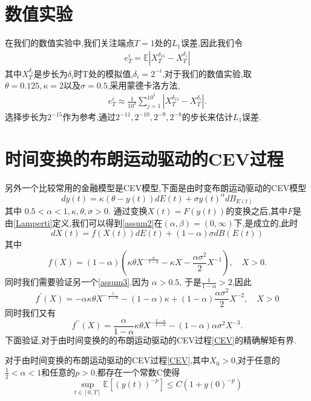 \section{数值实验}
在我们的数值实验中,我们关注端点$T = 1$处的$L_1$误差,因此我们令
\begin{align*}
	e_T^{i}=\mathbb{E}\left|X_T^{\delta _{15}}-X_T^{\delta _i}\right|
\end{align*}
其中$X_T^{\delta _i}$是步长为$\delta _i$时T处的模拟值,$\delta _i = 2^{-i}$,对于我们的数值实验,取$\theta=0.125,\kappa=2$以及$\sigma=0.5$,采用蒙德卡洛方法,
\begin{align*}
	e_{T}^i\approx\frac{1}{10^3}\sum_{j=1}^{10^3}\left|X_T^{\delta _{15}}-X_T^{\delta _i}\right|.
\end{align*}
选择步长为$2^{-15}$作为参考,通过${2^{-11},2^{-10},2^{-9},2^{-8}}$的步长来估计$L_1$误差.
\section{时间变换的布朗运动驱动的CEV过程}
另外一个比较常用的金融模型是CEV模型,下面是由时变布朗运动驱动的CEV模型
\begin{equation}\label{CEV}
	dy(t)=\kappa(\theta-y(t))dE(t)+\sigma y(t)^\alpha dB_{E(t)}
\end{equation}
其中 $0.5<\alpha<1,\kappa,\theta,\sigma>0.$ 通过变换$X(t)=F(y(t))$的变换之后,其中$F$是由\cref{Lamperti}定义,我们可以得到\cref{assum2}在$(\alpha,\beta)=(0,\infty)$下,是成立的,此时	$$dX(t)=f(X(t))dE(t)+(1-\alpha)\sigma dB(E(t))$$
其中
$$f(X)=(1-\alpha)\left(\kappa\theta X^{-\frac\alpha{1-\alpha}}-\kappa X-\frac{\alpha\sigma^2}2X^{-1}\right),\quad X>0.$$
同时我们需要验证另一个\cref{assum3}.因为 $\alpha>0.5$, 于是$\frac{1}{1-\alpha}>2$,因此
$$f^{\prime}(X)=-\alpha\kappa\theta X^{-\frac1{1-\alpha}}-(1-\alpha)\kappa+(1-\alpha)\frac{\alpha\sigma^2}2X^{-2},\quad X>0$$
同时我们又有
$$f^{\prime\prime}(X)=\frac\alpha{1-\alpha}\kappa\theta X^{-\frac{2-\alpha}{1-\alpha}}-(1-\alpha)\alpha\sigma^2X^{-3}.$$
下面验证,对于由时间变换的的布朗运动驱动的CEV过程\cref{CEV}的精确解矩有界.
\begin{proposition}
	对于由时间变换的布朗运动驱动的CEV过程\cref{CEV},其中$X_0>0$,对于任意的$\frac{1}{2}<\alpha<1$和任意的$p>0$,都存在一个常数C使得
	\begin{equation*}
		\sup\limits_{t\in[0,T]}\mathbb{E}\left[\left(y(t)\right)^{-p}\right]\leq C(1+y(0)^{-p})
	\end{equation*}
\end{proposition}
